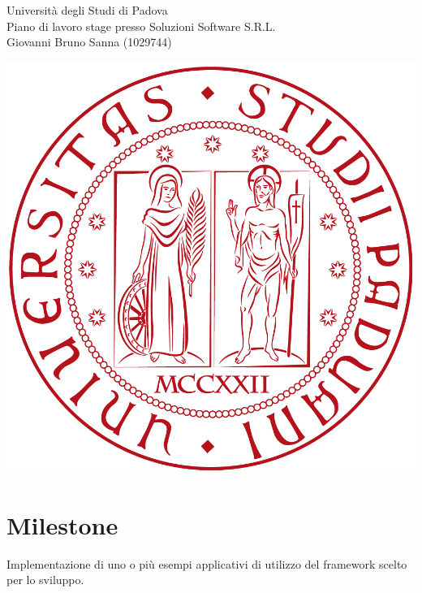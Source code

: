 \documentclass[11pt,notitlepage]{article}
\newcommand{\nomeStudente}{Giovanni Bruno}
\newcommand{\cognomeStudente}{Sanna}
\newcommand{\matricolaStudente}{1029744}
\newcommand{\ragioneSocAzienda}{Soluzioni Software S.R.L.}
\begin{document}
\noindent
\parbox{0.7\columnwidth}{Università degli Studi di Padova\\
	Piano di lavoro stage presso \ragioneSocAzienda{}\\
	\nomeStudente{} \cognomeStudente{} (\matricolaStudente{})}%
\parbox{0.3\columnwidth}{
	\hfill \includegraphics[scale=0.08]{immagini/logo-unipd.png}}

\bigskip
\section*{Milestone}
Implementazione di uno o più esempi applicativi di utilizzo del framework scelto per lo sviluppo.

\bigskip
\end{document}
